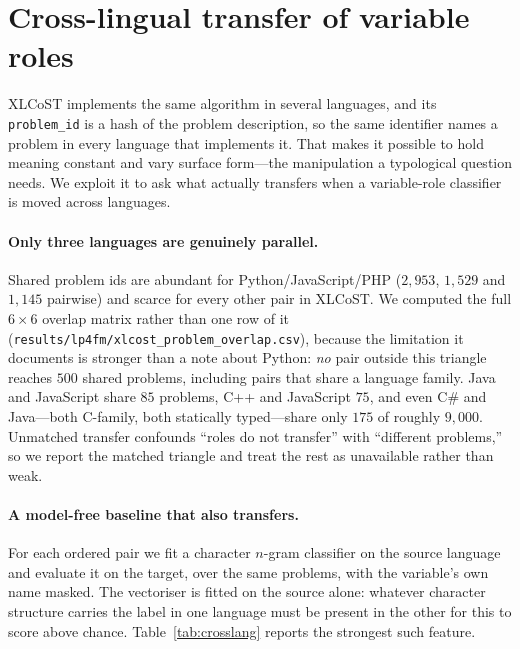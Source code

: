 %

\section{Cross-lingual transfer of variable roles}
\label{sec:crosslang}

XLCoST implements the same algorithm in several languages, and its
\texttt{problem\_id} is a hash of the problem description, so the same
identifier names a problem in every language that implements it. That makes
it possible to hold meaning constant and vary surface form---the manipulation
a typological question needs. We exploit it to ask what actually transfers
when a variable-role classifier is moved across languages.

\paragraph{Only three languages are genuinely parallel.} Shared problem ids
are abundant for Python/JavaScript/PHP ($2{,}953$, $1{,}529$ and $1{,}145$
pairwise) and scarce for every other pair in XLCoST. We computed the full
$6\times 6$ overlap matrix rather than one row of it
(\texttt{results/lp4fm/xlcost\_problem\_overlap.csv}), because the limitation
it documents is stronger than a note about Python: \emph{no} pair outside this
triangle reaches $500$ shared problems, including pairs that share a language
family. Java and JavaScript share $85$ problems, C++ and JavaScript $75$, and
even C\# and Java---both C-family, both statically typed---share only $175$ of
roughly $9{,}000$.
Unmatched transfer confounds ``roles do not transfer'' with ``different
problems,'' so we report the matched triangle and treat the rest as
unavailable rather than weak.

\paragraph{A model-free baseline that also transfers.} For each ordered pair
we fit a character $n$-gram classifier on the source language and evaluate it
on the target, over the same problems, with the variable's own name masked.
The vectoriser is fitted on the source alone: whatever character structure
carries the label in one language must be present in the other for this to
score above chance. Table~\ref{tab:crosslang} reports the strongest such
feature.

